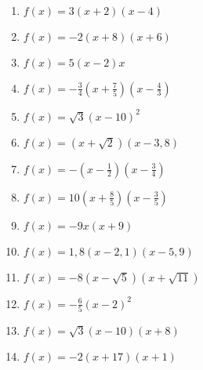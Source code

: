 \begin{Exercise}[title={Bestimme die Nullstellen}, label=produktformNullstellenA1]\\
	\begin{minipage}{\textwidth}
		\begin{minipage}{0.5\textwidth}
			\begin{enumerate}[label=\alph*)]
				\item \(f(x)=3\left(x+2\right)\left(x-4\right)\)
				\item \(f(x)=-2\left(x+8\right)\left(x+6\right)\)
				\item \(f(x)=5\left(x-2\right)x\)
				\item \(f(x)=-\frac{3}{4}\left(x+\frac{7}{5}\right)\left(x-\frac{4}{3}\right)\)
				\item \(f(x)=\sqrt{3}\left(x-10\right)^2\)
				\item \(f(x)=\left(x+\sqrt{2}\right)\left(x-3,8\right)\)
				\item \(f(x)=-\left(x-\frac{1}{2}\right)\left(x-\frac{3}{4}\right)\)
			\end{enumerate}
		\end{minipage}%
		\begin{minipage}{0.5\textwidth}
			\begin{enumerate}[label=\alph*)]
				\setcounter{enumi}{7}
				\item \(f(x)=10\left(x+\frac{8}{5}\right)\left(x-\frac{3}{5}\right)\)
				\item \(f(x)=-9x\left(x+9\right)\)
				\item \(f(x)=1,8\left(x-2,1\right)\left(x-5,9\right)\)
				\item \(f(x)=-8\left(x-\sqrt{5}\right)\left(x+\sqrt{11}\right)\)
				\item \(f(x)=-\frac{6}{5}\left(x-2\right)^2\)
				\item \(f(x)=\sqrt{3}\left(x-10\right)\left(x+8\right)\)
				\item \(f(x)=-2\left(x+17\right)\left(x+1\right)\)
			\end{enumerate}
		\end{minipage}%
	\end{minipage}%
\end{Exercise}

